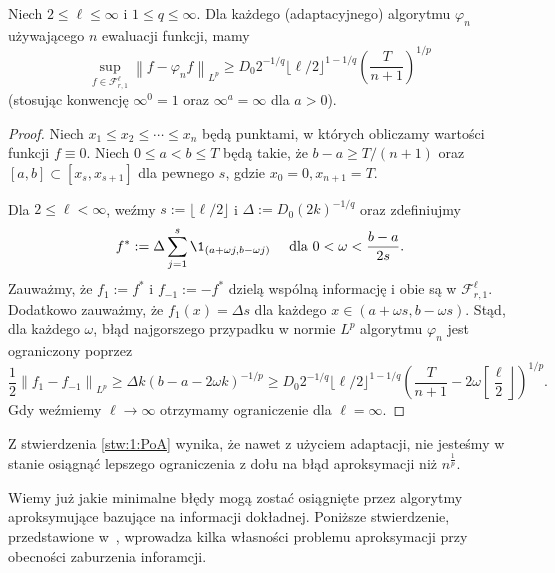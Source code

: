 \documentclass[oik, pdftex, man]{mgrwms}
\begin{document}
    \begin{stw} \label{stw:1:PoA}
        Niech $2 \leq \ell \leq \infty$ i $1 \leq q \leq \infty$. Dla każdego (adaptacyjnego) algorytmu $\varphi_{n}$ używającego $n$ ewaluacji funkcji, mamy
        \begin{equation*}
            \sup _{f \in \mathcal{F}_{r, 1}^{\ell}}\left\|f-\varphi_{n} f\right\|_{L^{p}} \geq D_{0} 2^{-1 / q}\lfloor\ell / 2\rfloor^{1-1 / q}\left(\frac{T}{n+1}\right)^{1 / p}    
        \end{equation*}
        (stosując konwencję $\infty^{0}=1$ oraz $\infty^{a}=\infty$ dla $a>0$).
    \end{stw}
    \begin{proof}
        Niech $x_{1} \leq x_{2} \leq \cdots \leq x_{n}$ będą punktami, w których obliczamy wartości funkcji $f \equiv 0$. Niech $0 \leq a<b \leq T$ będą takie, że $b-a \geq T /(n+1)$ oraz $[a, b] \subset\left[x_{s}, x_{s+1}\right]$ dla pewnego $s$, gdzie $x_{0}=0, x_{n+1}=T$.

        Dla $2 \leq \ell<\infty$, weźmy $s:=\lfloor\ell / 2\rfloor$ i $\Delta:=D_{0}(2 k)^{-1 / q}$ oraz zdefiniujmy
        \begin{equation*}
            f^{*}:=\Delta \sum_{j=1}^{s} \1_{(a+\omega j, b-\omega j)} \quad \text{ dla } 0<\omega<\frac{b-a}{2 s}.
        \end{equation*}
        Zauważmy, że $f_{1}:=f^{*}$ i $f_{-1}:=-f^{*}$ dzielą wspólną informację i obie są w $\mathcal{F}_{r, 1}^{\ell}$. Dodatkowo zauważmy, że  $f_{1}(x)=\Delta s$ dla każdego $x \in(a+\omega s, b-\omega s)$. Stąd, dla każdego $\omega$, błąd najgorszego przypadku w normie $L^{p}$ algorytmu $\varphi_{n}$ jest ograniczony poprzez
        \begin{equation*}
            \frac{1}{2}\left\|f_{1}-f_{-1}\right\|_{L^{p}} \geq \Delta k(b-a-2 \omega k)^{-1 / p} \geq D_{0} 2^{-1 / q}\lfloor\ell / 2\rfloor^{1-1 / q}\left(\frac{T}{n+1}-2 \omega\left[\frac{\ell}{2}\right\rfloor\right)^{1 / p}.
        \end{equation*}
        Gdy weźmiemy $\ell \rightarrow \infty$ otrzymamy ograniczenie dla $\ell = \infty$.
    \end{proof}

    Z stwierdzenia \ref{stw:1:PoA} wynika, że nawet z użyciem adaptacji, nie jesteśmy w stanie osiągnąć lepszego ograniczenia z dołu na błąd aproksymacji niż $n^{\frac{1}{p}}$.

    Wiemy już jakie minimalne błędy mogą zostać osiągnięte przez algorytmy aproksymujące bazujące na informacji dokładnej. Poniższe stwierdzenie, przedstawione w~\cite{AoP}, wprowadza kilka własności problemu aproksymacji przy obecności zaburzenia inforamcji.
\end{document}
